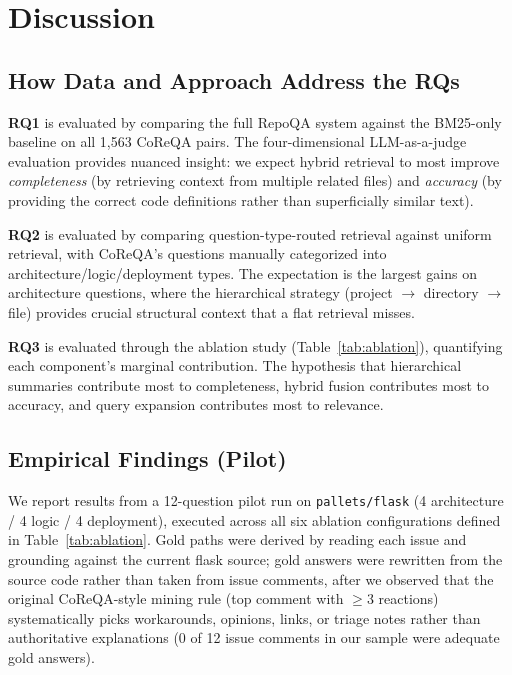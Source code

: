 \documentclass[11pt]{article}
\begin{document}
\section{Discussion}

\subsection{How Data and Approach Address the RQs}

\textbf{RQ1} is evaluated by comparing the full RepoQA system against the BM25-only baseline on all 1,563 CoReQA pairs. The four-dimensional LLM-as-a-judge evaluation provides nuanced insight: we expect hybrid retrieval to most improve \textit{completeness} (by retrieving context from multiple related files) and \textit{accuracy} (by providing the correct code definitions rather than superficially similar text).

\textbf{RQ2} is evaluated by comparing question-type-routed retrieval against uniform retrieval, with CoReQA's questions manually categorized into architecture/logic/deployment types. The expectation is the largest gains on architecture questions, where the hierarchical strategy (project $\rightarrow$ directory $\rightarrow$ file) provides crucial structural context that a flat retrieval misses.

\textbf{RQ3} is evaluated through the ablation study (Table~\ref{tab:ablation}), quantifying each component's marginal contribution. The hypothesis that hierarchical summaries contribute most to completeness, hybrid fusion contributes most to accuracy, and query expansion contributes most to relevance.

\subsection{Empirical Findings (Pilot)}
\label{sec:findings}

We report results from a 12-question pilot run on \texttt{pallets/flask} (4 architecture / 4 logic / 4 deployment), executed across all six ablation configurations defined in Table~\ref{tab:ablation}. Gold paths were derived by reading each issue and grounding against the current flask source; gold answers were rewritten from the source code rather than taken from issue comments, after we observed that the original CoReQA-style mining rule (top comment with $\geq 3$ reactions) systematically picks workarounds, opinions, links, or triage notes rather than authoritative explanations (0 of 12 issue comments in our sample were adequate gold answers).
\end{document}
